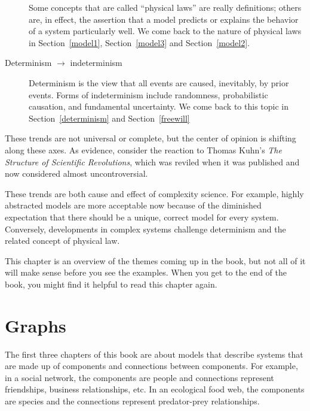 \documentclass[12pt]{book}
\theoremstyle{exercise}
\begin{document}
\begin{description}

  Some concepts that are called ``physical laws'' are really
  definitions; others are, in effect, the assertion that a model
  predicts or explains the behavior of a system particularly well.
  We come back to the nature of physical laws
  in Section~\ref{model1}, Section~\ref{model3} and Section~\ref{model2}.

\item[Determinism $\rightarrow$ indeterminism] Determinism is the view
  that all events are caused, inevitably, by prior events.  Forms of
  indeterminism include randomness, probabilistic causation, and
  fundamental uncertainty.  We come back to this
  topic in Section~\ref{determinism} and Section~\ref{freewill}


\end{description}

These trends are not universal or complete, but the center of
opinion is shifting along these axes.  As evidence, consider the
reaction to Thomas Kuhn's {\em The Structure of Scientific
  Revolutions}, which was reviled when it was published and
now considered almost uncontroversial.


These trends are both cause and effect of complexity science.  For
example, highly abstracted models are more acceptable now because of
the diminished expectation that there should be a unique, correct model
for every system.  Conversely, developments in complex systems
challenge determinism and the related concept of physical law.

This chapter is an overview of the themes coming up in the book, but
not all of it will make sense before you see the examples.  When you
get to the end of the book, you might find it helpful to read this
chapter again.


\chapter{Graphs}
\label{graphs}

\newcommand{\Erdos}{Erd\H{o}s}
\newcommand{\Renyi}{R\'{e}nyi}

The first three chapters of this book are about models that describe
systems that are made up of components and connections between components.
For example, in a social network, the components are people and connections represent friendships, business relationships, etc.  In an ecological food web, the components are species and the connections represent predator-prey relationships.
\end{document}
